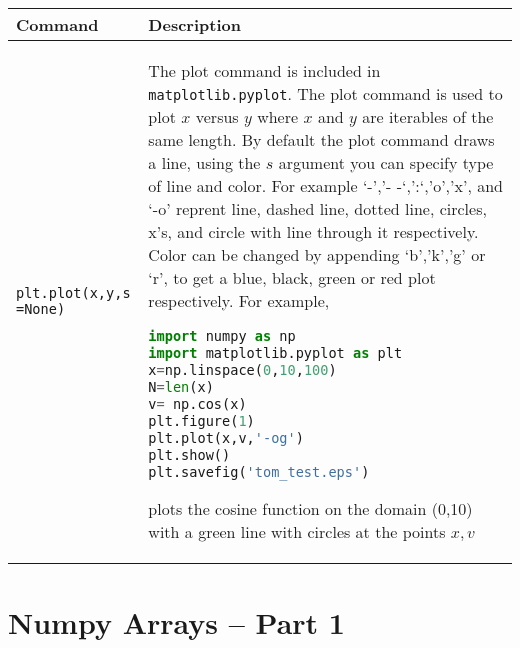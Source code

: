 \begin{tabular}[]{@{}ll@{}}
\toprule
\begin{minipage}[b]{0.17\columnwidth}\raggedright
Command
\end{minipage} & \begin{minipage}[b]{0.77\columnwidth}\raggedright
Description
\end{minipage}\tabularnewline
\midrule

\begin{minipage}[t]{0.17\columnwidth}\raggedright
\lstinline!plt.plot(x,y,s =None)!
\end{minipage} & \begin{minipage}[t]{0.77\columnwidth}\raggedright
The plot command is included in \lstinline!matplotlib.pyplot!. The plot
command is used to plot \(x\) versus \(y\) where \(x\) and \(y\) are
iterables of the same length. By default the plot command draws a line,
using the \(s\) argument you can specify type of line and color. For
example `-','- -`,':`,'o','x', and `-o' reprent line, dashed line,
dotted line, circles, x's, and circle with line through it respectively.
Color can be changed by appending `b','k','g' or `r', to get a blue,
black, green or red plot respectively. For example,

\begin{lstlisting}[language=Python]
import numpy as np
import matplotlib.pyplot as plt
x=np.linspace(0,10,100)
N=len(x)
v= np.cos(x)
plt.figure(1)
plt.plot(x,v,'-og')
plt.show()
plt.savefig('tom_test.eps')
\end{lstlisting}

plots the cosine function on the domain (0,10) with a green line with
circles at the points \(x,v\)
\end{minipage}\tabularnewline
\bottomrule
\end{tabular}

\section{Numpy Arrays -- Part 1}\label{numpy-arrays_pt1}

